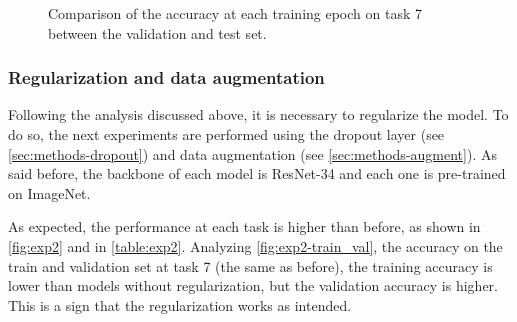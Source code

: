 \begin{figure}[H]
	\centering
	\caption{Comparison of the accuracy at each training epoch on task 7 between the validation and test set.}%
	\label{fig:exp1-train_val}%
\end{figure}

\subsubsection{Regularization and data augmentation}
Following the analysis discussed above, it is necessary to regularize the model.
To do so, the next experiments are performed using the dropout layer (see \autoref{sec:methods-dropout}) and data augmentation (see \autoref{sec:methods-augment}). As said before, the backbone of each model is ResNet-34 and each one is pre-trained on ImageNet.

As expected, the performance at each task is higher than before, as shown in \autoref{fig:exp2} and in \autoref{table:exp2}. Analyzing \autoref{fig:exp2-train_val}, the accuracy on the train and validation set at task 7 (the same as before), the training accuracy is lower than models without regularization, but the validation accuracy is higher. This is a sign that the regularization works as intended.


